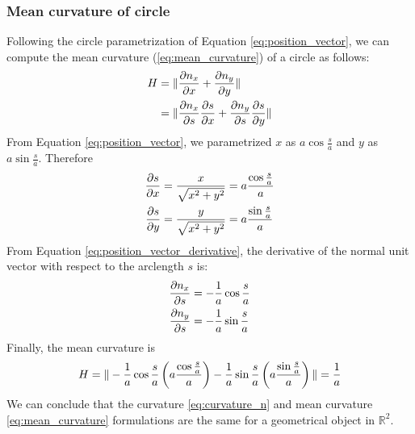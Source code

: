 \subsubsection{Mean curvature of circle}
\label{sec:mean_curvature_circle}

Following the circle parametrization of Equation \ref{eq:position_vector}, we can compute the mean curvature (\ref{eq:mean_curvature}) of a circle as follows:
%
\begin{equation}
	\centering
	\label{eq:mean_curvature_definition}
	\begin{split}
	H & = \Vert \frac{\partial n_{x}}{\partial x} + \frac{\partial n_{y}}{\partial y} \Vert \\
	  & = \Vert \frac{\partial n_{x}}{\partial s} \frac{\partial s}{\partial x} + \frac{\partial n_{y}}{\partial s} \frac{\partial s}{\partial y} \Vert
	\end{split}
\end{equation}
%
From Equation \ref{eq:position_vector}, we parametrized $x$ as $a\cos\frac{s}{a}$ and $y$ as $a\sin\frac{s}{a}$. Therefore
%
\begin{equation}
	\centering
	\label{eq:partial_derivatives_s}
	\begin{split}
	\frac{\partial s}{\partial x} & = \frac{x}{\sqrt{x ^ 2 + y ^ 2}} = a \frac{\cos\frac{s}{a}}{a} \\
	\frac{\partial s}{\partial y} & = \frac{y}{\sqrt{x ^ 2 + y ^ 2}} = a \frac{\sin\frac{s}{a}}{a}	
	\end{split}
\end{equation}
%
From Equation \ref{eq:position_vector_derivative}, the derivative of the normal unit vector with respect to the arclength $s$ is:
%
\begin{equation}
	\centering
	\begin{split}
	\frac{\partial n_{x}}{\partial s} & = -\frac{1}{a} \cos \frac{s}{a} \\
	\frac{\partial n_{y}}{\partial s} & = -\frac{1}{a} \sin \frac{s}{a}
	\end{split}
\end{equation}
% 
Finally, the mean curvature is
%
\begin{equation}
	\centering
	\label{eq:mean_curvature_solution}
	H = \Vert -\frac{1}{a} \cos \frac{s}{a} \left( a \frac{\cos\frac{s}{a}}{a} \right) - \frac{1}{a} \sin \frac{s}{a} \left( a \frac{\sin\frac{s}{a}}{a} \right) \Vert = \frac{1}{a}
\end{equation}
%
We can conclude that the curvature \ref{eq:curvature_n} and mean curvature \ref{eq:mean_curvature} formulations are the same for a geometrical object in $\mathbb{R}^2$.

